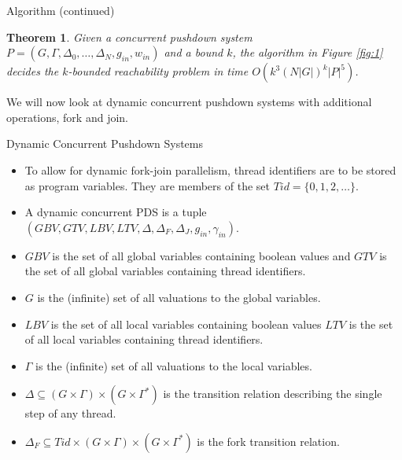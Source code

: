 \documentclass[10pt,notheorems]{beamer}
\theoremstyle{plain} %
\newtheorem{theorem}{Theorem}
\begin{document}
\begin{frame}{Algorithm (continued)}
    \begin{theorem}\label{thm4}
        Given a concurrent pushdown system $P=(G,\Gamma, \Delta_0,\dots,\Delta_N,g_{in},w_{in})$ and a bound $k$,
        the algorithm in Figure \ref{fig:1} decides the $k$-bounded reachability problem in time
        $O(k^3(N|G|)^k|P|^5)$.
    \end{theorem}
We will now look at dynamic concurrent pushdown systems with additional operations, fork and join. 
\end{frame}
\begin{frame}{Dynamic Concurrent Pushdown Systems}
    \begin{itemize}
        \item To allow for dynamic fork-join parallelism, thread identifiers are to be stored as program
        variables. They are members of the set $Tid=\{0,1,2,\dots\}$.
        \item A dynamic concurrent PDS is a tuple $(GBV,GTV,LBV,LTV,\Delta,\Delta_F,\Delta_J,g_{in},\gamma_{in})$.
        \item $GBV$ is the set of all global variables containing boolean values and $GTV$ is the 
        set of all global variables containing thread identifiers.
        \item $G$ is the (infinite) set of all valuations to the global variables.
        \item $LBV$ is the set of all local variables containing boolean values $LTV$ is the set of all
        local variables containing thread identifiers.
        \item $\Gamma$ is the (infinite) set of all valuations to the local variables.
        \item $\Delta\subseteq (G\times\Gamma)\times(G\times\Gamma^*)$ is the transition relation describing the single step of any thread.
        \item $\Delta_F\subseteq Tid\times (G\times\Gamma)\times(G\times\Gamma^*)$ is the fork transition 
        relation.
    \end{itemize}
\end{frame}
\end{document}
